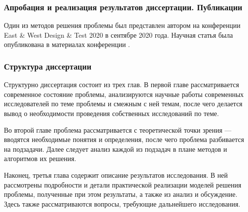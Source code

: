 \subsubsection{Апробация и реализация результатов диссертации. Публикации}
Один из методов решения проблемы был представлен автором на конференции East \& West Design \& Test 2020 в сентябре 2020 года.
Научная статья была опубликована в материалах конференции \cite{9224840}.

\subsubsection{Структура диссертации}
Структурно диссертация состоит из трех глав. В первой главе рассматривается современное состояние проблемы, анализируются
научные работы современных исследователей по теме проблемы и смежным с ней темам, после чего делается вывод о необходимости
проведения собственных исследований по теме.

Во второй главе проблема рассматривается с теоретической точки зрения --- вводятся необходимые понятия и определения, после чего
проблема разбивается на подзадачи. Далее следует анализ каждой из подзадач в плане методов и алгоритмов их решения.

Наконец, третья глава содержит описание результатов исследования. В ней рассмотрены подробности и детали практической реализации
моделей решения проблемы, полученные при этом результаты, а также из анализ и обсуждение. Здесь также рассматриваются вопросы,
требующие дальнейшего исследования.
